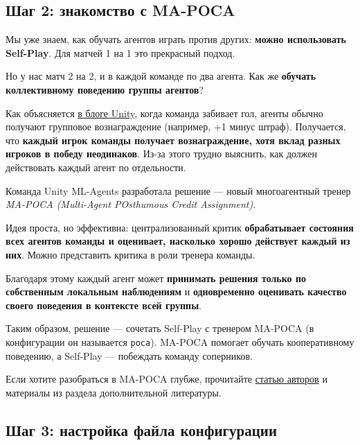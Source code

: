 \documentclass[11pt,a4paper]{article}
\begin{document}
\subsection{Шаг 2: знакомство с MA-POCA}\label{step-2-understand-ma-poca}

Мы уже знаем, как обучать агентов играть против других: \textbf{можно использовать Self-Play}. Для матчей 1 на 1 это прекрасный подход.

Но у нас матч 2 на 2, и в каждой команде по два агента. Как же \textbf{обучать коллективному поведению группы агентов}?

Как объясняется \href{https://blog.unity.com/technology/ml-agents-v20-release-now-supports-training-complex-cooperative-behaviors}{в блоге Unity}, когда команда забивает гол, агенты обычно получают групповое вознаграждение (например, +1 минус штраф). Получается, что \textbf{каждый игрок команды получает вознаграждение, хотя вклад разных игроков в победу неодинаков}. Из-за этого трудно выяснить, как должен действовать каждый агент по отдельности.

Команда Unity ML-Agents разработала решение --- новый многоагентный тренер \emph{MA-POCA (Multi-Agent POsthumous Credit Assignment)}.

Идея проста, но эффективна: централизованный критик \textbf{обрабатывает состояния всех агентов команды и оценивает, насколько хорошо действует каждый из них}. Можно представить критика в роли тренера команды.

Благодаря этому каждый агент может \textbf{принимать решения только по собственным локальным наблюдениям} и \textbf{одновременно оценивать качество своего поведения в контексте всей группы}.


Таким образом, решение --- сочетать Self-Play с тренером MA-POCA (в конфигурации он называется \texttt{poca}). MA-POCA помогает обучать кооперативному поведению, а Self-Play --- побеждать команду соперников.

Если хотите разобраться в MA-POCA глубже, прочитайте \href{https://arxiv.org/pdf/2111.05992.pdf}{статью авторов} и материалы из раздела дополнительной литературы.

\subsection{Шаг 3: настройка файла конфигурации}\label{step-3-define-the-config-file}
\end{document}
